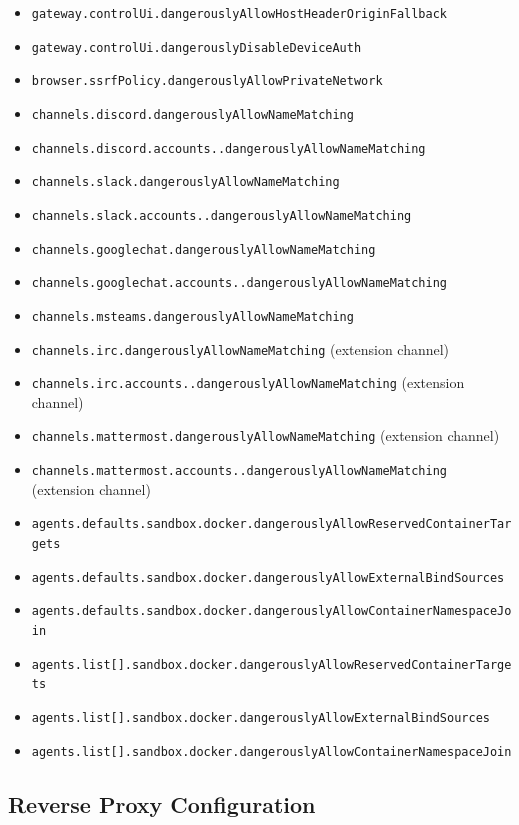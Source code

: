 \begin{itemize}
  \item \texttt{gateway.controlUi.dangerouslyAllowHostHeaderOriginFallback}
  \item \texttt{gateway.controlUi.dangerouslyDisableDeviceAuth}
  \item \texttt{browser.ssrfPolicy.dangerouslyAllowPrivateNetwork}
  \item \texttt{channels.discord.dangerouslyAllowNameMatching}
  \item \texttt{channels.discord.accounts..dangerouslyAllowNameMatching}
  \item \texttt{channels.slack.dangerouslyAllowNameMatching}
  \item \texttt{channels.slack.accounts..dangerouslyAllowNameMatching}
  \item \texttt{channels.googlechat.dangerouslyAllowNameMatching}
  \item \texttt{channels.googlechat.accounts..dangerouslyAllowNameMatching}
  \item \texttt{channels.msteams.dangerouslyAllowNameMatching}
  \item \texttt{channels.irc.dangerouslyAllowNameMatching} (extension channel)
  \item \texttt{channels.irc.accounts..dangerouslyAllowNameMatching} (extension channel)
  \item \texttt{channels.mattermost.dangerouslyAllowNameMatching} (extension channel)
  \item \texttt{channels.mattermost.accounts..dangerouslyAllowNameMatching} (extension channel)
  \item \texttt{agents.defaults.sandbox.docker.dangerouslyAllowReservedContainerTargets}
  \item \texttt{agents.defaults.sandbox.docker.dangerouslyAllowExternalBindSources}
  \item \texttt{agents.defaults.sandbox.docker.dangerouslyAllowContainerNamespaceJoin}
  \item \texttt{agents.list[].sandbox.docker.dangerouslyAllowReservedContainerTargets}
  \item \texttt{agents.list[].sandbox.docker.dangerouslyAllowExternalBindSources}
  \item \texttt{agents.list[].sandbox.docker.dangerouslyAllowContainerNamespaceJoin}
\end{itemize}


\subsection{Reverse Proxy Configuration}


